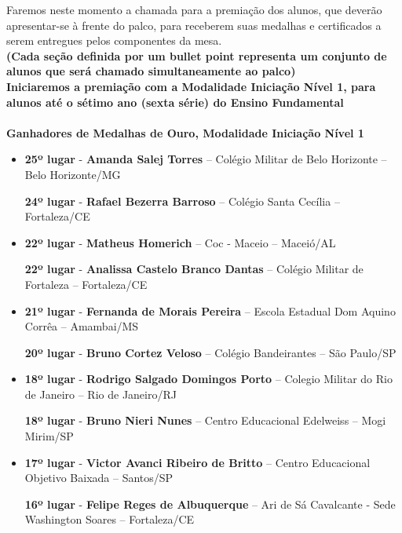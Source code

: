 \documentclass{article}
\begin{document}
Faremos neste momento a chamada para a premiação dos alunos, que deverão apresentar-se à frente do palco, para receberem suas medalhas e certificados a serem entregues pelos componentes da mesa.\\
\color{red}\textbf{(Cada seção definida por um bullet point representa um conjunto de alunos que será chamado simultaneamente ao palco)}\color{black}\\

\color{blue}
\textbf{Iniciaremos a premiação com a Modalidade Iniciação Nível 1, para alunos até o sétimo ano (sexta série) do Ensino Fundamental}\\\\
\textbf{\color{blue}Ganhadores de Medalhas de Ouro, \color{black}Modalidade Iniciação Nível 1}
\color{black}

\begin{itemize}
\item
\textbf{25º lugar} - \textbf{Amanda Salej Torres} – Colégio Militar de Belo Horizonte – Belo Horizonte/MG

\textbf{24º lugar} - \textbf{Rafael Bezerra Barroso} – Colégio Santa Cecília – Fortaleza/CE



\item
\textbf{22º lugar} - \textbf{Matheus Homerich} – Coc - Maceio – Maceió/AL


\textbf{22º lugar} - \textbf{Analissa Castelo Branco Dantas} – Colégio Militar de Fortaleza – Fortaleza/CE



\item
\textbf{21º lugar} - \textbf{Fernanda de Morais Pereira} – Escola Estadual Dom Aquino Corrêa – Amambai/MS


\textbf{20º lugar} - \textbf{Bruno Cortez Veloso} – Colégio Bandeirantes – São Paulo/SP



\item
\textbf{18º lugar} - \textbf{Rodrigo Salgado Domingos Porto} – Colegio Militar do Rio de Janeiro – Rio de Janeiro/RJ


\textbf{18º lugar} - \textbf{Bruno Nieri Nunes} – Centro Educacional Edelweiss – Mogi Mirim/SP



\item
\textbf{17º lugar} - \textbf{Victor Avanci Ribeiro de Britto} – Centro Educacional Objetivo Baixada – Santos/SP


\textbf{16º lugar} - \textbf{Felipe Reges de Albuquerque} – Ari de Sá Cavalcante - Sede Washington Soares – Fortaleza/CE




\end{itemize}
\end{document}
